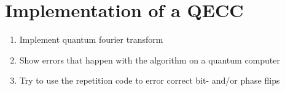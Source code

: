 \section{Implementation of a QECC}
\label{sec:implementation}

\begin{enumerate}
    \item Implement quantum fourier transform
    \item Show errors that happen with the algorithm on a quantum computer
    \item Try to use the repetition code to error correct bit- and/or phase flips
\end{enumerate}
